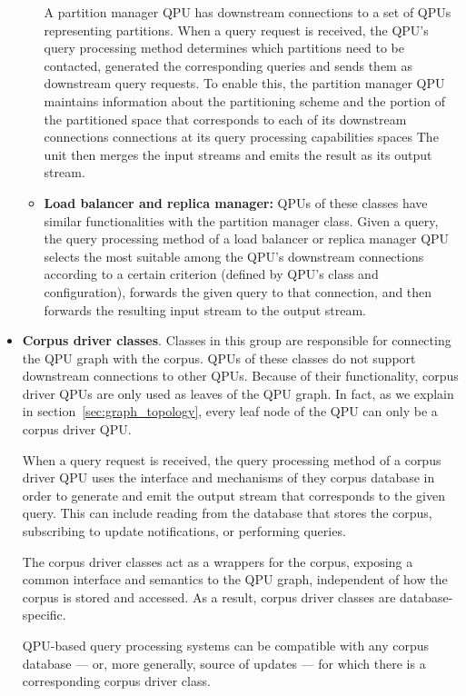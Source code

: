 \begin{itemize}
\begin{itemize}
    A partition manager QPU has downstream connections to a set of QPUs representing partitions.
    When a query request is received, the QPU's query processing method determines which partitions need to be contacted,
    generated the corresponding queries and sends them as downstream query requests.
    To enable this, the partition manager QPU maintains information about the partitioning scheme and the portion of
    the partitioned space that corresponds to each of its downstream connections connections at its query processing
    capabilities spaces
    The unit then merges the input streams and emits the result as its output stream.

    \item \textbf{Load balancer and replica manager:}
    QPUs of these classes have similar functionalities with the partition manager class.
    Given a query, the query processing method of a load balancer or replica manager QPU selects the most suitable
    among the QPU's downstream connections according to a certain criterion (defined by QPU's class and configuration),
    forwards the given query to that connection, and then forwards the resulting input stream to the output stream.
    \end{itemize}

  \item \textbf{Corpus driver classes}.
  Classes in this group are responsible for connecting the QPU graph with the corpus.
  QPUs of these classes do not support downstream connections to other QPUs.
  Because of their functionality, corpus driver QPUs are only used as leaves of the QPU graph.
  In fact, as we explain in section~\ref{sec:graph_topology}, every leaf node of the QPU can only be a corpus driver QPU.

  When a query request is received, the query processing method of a corpus driver QPU uses the interface and mechanisms
  of they corpus database in order to generate and emit the output stream that corresponds to the given query.
  This can include reading from the database that stores the corpus, subscribing to update notifications,
  or performing queries.

  The corpus driver classes act as a wrappers for the corpus, exposing a common interface and semantics to the
  QPU graph, independent of how the corpus is stored and accessed.
  As a result, corpus driver classes are database-specific.

  QPU-based query processing systems can be compatible with any corpus database --- or, more generally, source of updates ---
  for which there is a corresponding corpus driver class.
\end{itemize}

